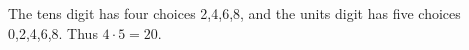 The tens digit has four choices 2,4,6,8, and the units digit has five choices 0,2,4,6,8. Thus $4\cdot5=\boxed{20}$.
